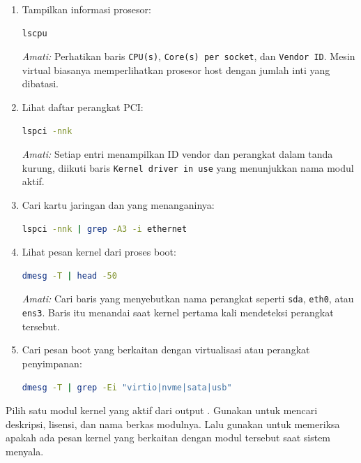 \begin{enumerate}
    \item Tampilkan informasi prosesor:
\begin{lstlisting}[language=bash, caption={Membaca spesifikasi prosesor}]
lscpu
\end{lstlisting}
    \textit{Amati:} Perhatikan baris \texttt{CPU(s)}, \texttt{Core(s) per socket}, dan \texttt{Vendor ID}. Mesin virtual biasanya memperlihatkan prosesor host dengan jumlah inti yang dibatasi.

    \item Lihat daftar perangkat PCI:
\begin{lstlisting}[language=bash, caption={Daftar perangkat PCI beserta driver aktif}]
lspci -nnk
\end{lstlisting}
    \textit{Amati:} Setiap entri menampilkan ID vendor dan perangkat dalam tanda kurung, diikuti baris \texttt{Kernel driver in use} yang menunjukkan nama modul  aktif.

    \item Cari kartu jaringan dan  yang menanganinya:
\begin{lstlisting}[language=bash, caption={Filter informasi kartu jaringan}]
lspci -nnk | grep -A3 -i ethernet
\end{lstlisting}

    \item Lihat pesan kernel dari proses boot:
\begin{lstlisting}[language=bash, caption={Pesan kernel saat boot}]
dmesg -T | head -50
\end{lstlisting}
    \textit{Amati:} Cari baris yang menyebutkan nama perangkat seperti \texttt{sda}, \texttt{eth0}, atau \texttt{ens3}. Baris itu menandai saat kernel pertama kali mendeteksi perangkat tersebut.

    \item Cari pesan boot yang berkaitan dengan virtualisasi atau perangkat penyimpanan:
\begin{lstlisting}[language=bash, caption={Menyaring pesan kernel dengan dmesg}]
dmesg -T | grep -Ei "virtio|nvme|sata|usb"
\end{lstlisting}
\end{enumerate}

\begin{challengebox}
Pilih satu modul kernel yang aktif dari output . Gunakan  untuk mencari deskripsi, lisensi, dan nama berkas modulnya. Lalu gunakan  untuk memeriksa apakah ada pesan kernel yang berkaitan dengan modul tersebut saat sistem menyala.
\end{challengebox}

